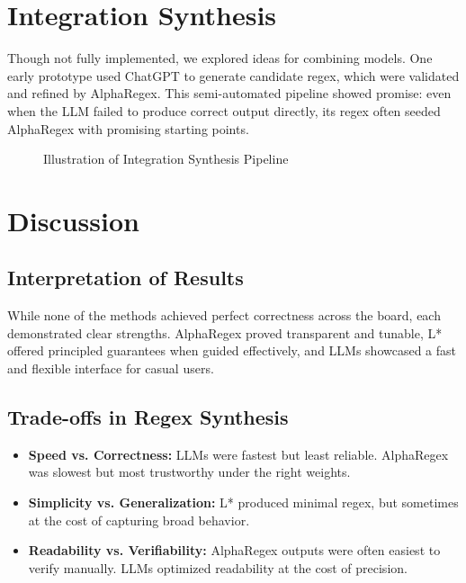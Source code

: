 \section{Integration Synthesis}

\indent\indent Though not fully implemented, we explored ideas for combining models. One early prototype used ChatGPT to generate candidate regex, which were validated and refined by AlphaRegex. This semi-automated pipeline showed promise: even when the LLM failed to produce correct output directly, its regex often seeded AlphaRegex with promising starting points.

\begin{figure}[h!]
\centering
{}
\caption{Illustration of Integration Synthesis Pipeline}
\end{figure}

\section{Discussion}

\subsection{Interpretation of Results}

\indent\indent While none of the methods achieved perfect correctness across the board, each demonstrated clear strengths. AlphaRegex proved transparent and tunable, L* offered principled guarantees when guided effectively, and LLMs showcased a fast and flexible interface for casual users.

\subsection{Trade-offs in Regex Synthesis}

\begin{itemize}
\item \textbf{Speed vs. Correctness:} LLMs were fastest but least reliable. AlphaRegex was slowest but most trustworthy under the right weights.
\item \textbf{Simplicity vs. Generalization:} L* produced minimal regex, but sometimes at the cost of capturing broad behavior.
\item \textbf{Readability vs. Verifiability:} AlphaRegex outputs were often easiest to verify manually. LLMs optimized readability at the cost of precision.
\end{itemize}

